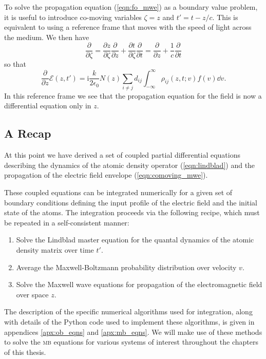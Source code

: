     To solve the propagation equation (\ref{eqn:fo_mwe}) as a boundary value
    problem, it is useful to introduce co-moving variables $\zeta = z$ and $t' =
    t - z/c$. This is equivalent to using a reference frame that moves with the
    speed of light across the medium.\cite{Icsevgi1964} We then have
    \begin{equation}
    \frac{\partial}{\partial \zeta} = \frac{\partial z}{\partial \zeta} \frac{\partial}{\partial z} +  \frac{\partial t}{\partial \zeta} \frac{\partial}{\partial t} = \frac{\partial}{\partial z} + \frac{1}{c} \frac{\partial}{\partial t}      
    \end{equation}
    so that
    \begin{equation}\label{eqn:comoving_mwe}
      \frac{\partial}{\partial z} \mathcal{E}(z,t') = 
        \mathrm{i} \frac{k}{2 \epsilon_0}
        N(z) \sum_{i \ne j} d_{ij} \int_{-\infty}^{\infty} 
          \rho_{ij}(z,t; v) f(v) {\dd v}. 
    \end{equation}
    In this reference frame we see that the propagation equation for the field
    is now a differential equation only in $z$.

  \subsection{A Recap}

    At this point we have derived a set of coupled partial differential
    equations describing the dynamics of the atomic density operator
    (\ref{eqn:lindblad}) and the propagation of the electric field envelope
    (\ref{eqn:comoving_mwe}).

    These coupled equations can be integrated numerically for a given set of
    boundary conditions defining the input profile of the electric field and the
    initial state of the atoms. The integration proceeds via the following
    recipe, which must be repeated in a self-consistent manner:
    \begin{enumerate}
      \item Solve the Lindblad master equation for the quantal dynamics of the
        atomic density matrix over time $t'$.
      \item Average the Maxwell-Boltzmann probability distribution over velocity
        $v$.
      \item Solve the Maxwell wave equations for propagation of the 
        electromagnetic field over space $z$.
    \end{enumerate}

    The description of the specific numerical algorithms used for integration,
    along with details of the Python code used to implement these algorithms, is
    given in appendices \ref{apx:ob_eqns} and \ref{apx:mb_eqns}. We will make
    use of these methods to solve the \textsc{mb} equations for various systems
    of interest throughout the chapters of this thesis.

